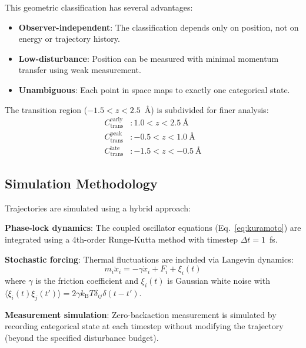\documentclass[twocolumn,amsmath,amssymb,aps,prb,superscriptaddress,longbibliography]{revtex4-2}
\newcommand{\kB}{k_{\mathrm{B}}}
\begin{document}
This geometric classification has several advantages:
\begin{itemize}
\item \textbf{Observer-independent}: The classification depends only on position, not on energy or trajectory history.
\item \textbf{Low-disturbance}: Position can be measured with minimal momentum transfer using weak measurement.
\item \textbf{Unambiguous}: Each point in space maps to exactly one categorical state.
\end{itemize}

The transition region ($-1.5 < z < 2.5$~\AA) is subdivided for finer analysis:
\begin{align}
C_{\text{trans}}^{\text{early}} &: 1.0 < z < 2.5~\text{\AA} \\
C_{\text{trans}}^{\text{peak}} &: -0.5 < z < 1.0~\text{\AA} \\
C_{\text{trans}}^{\text{late}} &: -1.5 < z < -0.5~\text{\AA}
\end{align}

\subsection{Simulation Methodology}

Trajectories are simulated using a hybrid approach:

\textbf{Phase-lock dynamics}: The coupled oscillator equations (Eq.~\ref{eq:kuramoto}) are integrated using a 4th-order Runge-Kutta method with timestep $\Delta t = 1$~fs.

\textbf{Stochastic forcing}: Thermal fluctuations are included via Langevin dynamics:
\begin{equation}
m_i \ddot{x}_i = -\gamma \dot{x}_i + F_i + \xi_i(t)
\end{equation}
where $\gamma$ is the friction coefficient and $\xi_i(t)$ is Gaussian white noise with $\langle \xi_i(t) \xi_j(t') \rangle = 2\gamma \kB T \delta_{ij} \delta(t-t')$.

\textbf{Measurement simulation}: Zero-backaction measurement is simulated by recording categorical state at each timestep without modifying the trajectory (beyond the specified disturbance budget).
\end{document}
